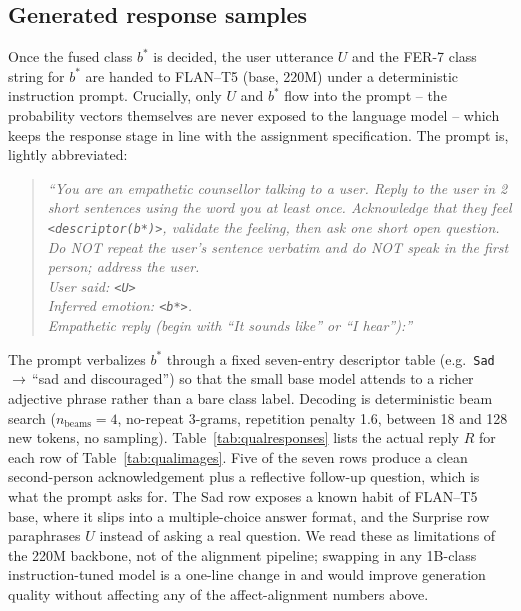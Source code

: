 \documentclass[sigconf,nonacm]{acmart}
\begin{document}
  \subsection{Generated response samples}\label{sec:gen-samples}
  Once the fused class $b^{*}$ is decided, the user utterance $U$ and the FER-7 class string for $b^{*}$ are handed to FLAN--T5 (base, 220M) under a deterministic instruction prompt. Crucially, only $U$ and $b^{*}$ flow into the prompt -- the probability vectors themselves are never exposed to the language model -- which keeps the response stage in line with the assignment specification. The prompt is, lightly abbreviated:
  \begin{quote}\small\itshape
  ``You are an empathetic counsellor talking to a user. Reply to the user in 2 short sentences using the word \emph{you} at least once. Acknowledge that they feel \texttt{<descriptor(b*)>}, validate the feeling, then ask one short open question. Do NOT repeat the user's sentence verbatim and do NOT speak in the first person; address the user.\\ User said: \texttt{<U>}\\ Inferred emotion: \texttt{<b*>}.\\ Empathetic reply (begin with ``It sounds like'' or ``I hear''):''
  \end{quote}
  The prompt verbalizes $b^{*}$ through a fixed seven-entry descriptor table (e.g.\ \texttt{Sad}\,$\to$\,``sad and discouraged'') so that the small base model attends to a richer adjective phrase rather than a bare class label. Decoding is deterministic beam search ($n_\text{beams}\!=\!4$, no-repeat 3-grams, repetition penalty 1.6, between 18 and 128 new tokens, no sampling). Table~\ref{tab:qualresponses} lists the actual reply $R$ for each row of Table~\ref{tab:qualimages}. Five of the seven rows produce a clean second-person acknowledgement plus a reflective follow-up question, which is what the prompt asks for. The Sad row exposes a known habit of FLAN--T5 base, where it slips into a multiple-choice answer format, and the Surprise row paraphrases $U$ instead of asking a real question. We read these as limitations of the 220M backbone, not of the alignment pipeline; swapping in any 1B-class instruction-tuned model is a one-line change in  and would improve generation quality without affecting any of the affect-alignment numbers above.
\end{document}
